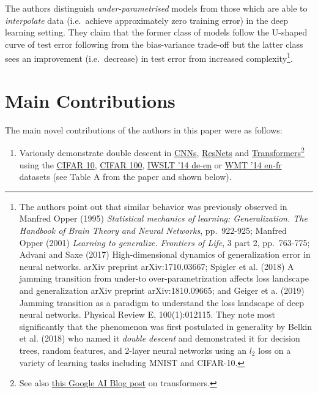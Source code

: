 \documentclass[]{article}
\providecommand{\tightlist}{%
  \setlength{\itemsep}{0pt}\setlength{\parskip}{0pt}}
\begin{document}
The authors distinguish \emph{under-parametrised} models from those
which are able to \emph{interpolate} data (i.e.~achieve approximately
zero training error) in the deep learning setting. They claim that the
former class of models follow the U-shaped curve of test error following
from the bias-variance trade-off but the latter class sees an
improvement (i.e.~decrease) in test error from increased
complexity\footnote{The authors point out that similar behavior was
  previously observed in Manfred Opper (1995) \emph{Statistical
  mechanics of learning: Generalization. The Handbook of Brain Theory
  and Neural Networks}, pp.~922-925; Manfred Opper (2001) \emph{Learning
  to generalize. Frontiers of Life}, 3 part 2, pp.~763-775; Advani and
  Saxe (2017) High-dimensional dynamics of generalization error in
  neural networks. arXiv preprint arXiv:1710.03667; Spigler et al.
  (2018) A jamming transition from under-to over-parametrization affects
  loss landscape and generalization arXiv preprint arXiv:1810.09665; and
  Geiger et a. (2019) Jamming transition as a paradigm to understand the
  loss landscape of deep neural networks. Physical Review E,
  100(1):012115. They note most significantly that the phenomenon was
  first postulated in generality by Belkin et al. (2018) who named it
  \emph{double descent} and demonstrated it for decision trees, random
  features, and 2-layer neural networks using an \(l_2\) loss on a
  variety of learning tasks including MNIST and CIFAR-10.}.

\section{Main Contributions}

The main novel contributions of the authors in this paper were as
follows:

\begin{enumerate}
\def\labelenumi{\arabic{enumi}.}
\tightlist
\item
  Variously demonstrate double descent in
  \href{https://en.wikipedia.org/wiki/Convolutional_neural_network}{CNNs},
  \href{https://en.wikipedia.org/wiki/Residual_neural_network}{ResNets}
  and
  \href{https://en.wikipedia.org/wiki/Transformer_(machine_learning_model)}{Transformers}\footnote{See
    also
    \href{https://ai.googleblog.com/2017/08/transformer-novel-neural-network.html}{this
    Google AI Blog post} on transformers.} using the
  \href{https://en.wikipedia.org/wiki/CIFAR-10}{CIFAR 10},
  \href{https://www.cs.toronto.edu/~kriz/cifar.html}{CIFAR 100},
  \href{http://www.statmt.org/wmt14/translation-task.html}{IWSLT '14
  de-en} or
  \href{https://www.tensorflow.org/datasets/catalog/wmt14_translate}{WMT
  '14 en-fr} datasets (see Table A from the paper and shown below).
\end{enumerate}
\end{document}
